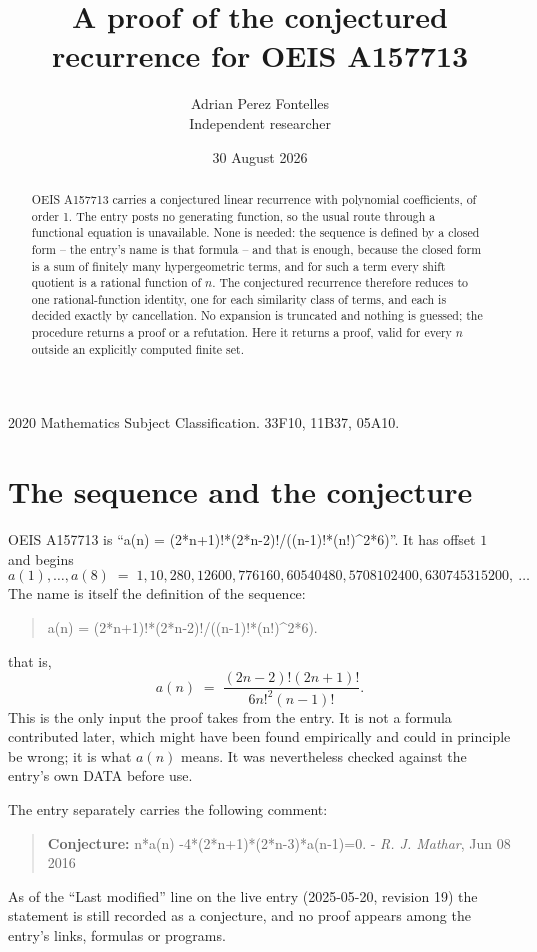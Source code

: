 \documentclass[11pt,a4paper]{article}
\title{A proof of the conjectured recurrence for OEIS A157713}
\author{Adrian Perez Fontelles\\ \small Independent researcher}
\date{30 August 2026}
\theoremstyle{plain}
\theoremstyle{definition}
\begin{document}
\maketitle

\begin{abstract}
OEIS A157713 carries a conjectured linear recurrence with polynomial coefficients, of
order 1. The entry posts no generating function, so the usual route through a
functional equation is unavailable. None is needed: the sequence is defined by a closed
form -- the entry's name is that formula -- and that is enough, because the closed form is a sum of finitely many hypergeometric terms, and for such a
term every shift quotient is a rational function of $n$. The conjectured recurrence
therefore reduces to one rational-function identity, one for each similarity
class of terms, and each is decided exactly by cancellation. No expansion is truncated and
nothing is guessed; the procedure returns a proof or a refutation. Here it returns a proof,
valid for every $n$ outside an explicitly computed finite set.
\end{abstract}

\noindent\small 2020 Mathematics Subject Classification. 33F10, 11B37, 05A10.\normalsize

\section{The sequence and the conjecture}

OEIS A157713 is ``a(n) = (2*n+1)!*(2*n-2)!/((n-1)!*(n!)\textasciicircum{}2*6)''. It has offset $1$ and begins
\[
a(1),\dots,a(8)\;=\;1, 10, 280, 12600, 776160, 60540480, 5708102400, 630745315200,\ \dots
\]
The name is itself the definition of the sequence:
\begin{quote}\small
a(n) = (2*n+1)!*(2*n-2)!/((n-1)!*(n!)\textasciicircum{}2*6).
\end{quote}
that is,
\begin{equation}\label{eq:cf}
a(n)\;=\;\frac{\left(2 n - 2\right)! \left(2 n + 1\right)!}{6 n!^{2} \left(n - 1\right)!} .
\end{equation}
This is the only input the proof takes from the entry. It is not a formula contributed
later, which might have been found empirically and could in principle be wrong; it is what
$a(n)$ means. It was nevertheless checked against the entry's own DATA before use.

The entry separately carries the following comment:
\begin{quote}\small
\textbf{Conjecture:} n*a(n) -4*(2*n+1)*(2*n-3)*a(n-1)=0. - \emph{R. J. Mathar}, Jun 08 2016
\end{quote}
As of the ``Last modified'' line on the live entry (2025-05-20, revision 19) the
statement is still recorded as a conjecture, and no proof appears among the entry's links,
formulas or programs.
\end{document}
